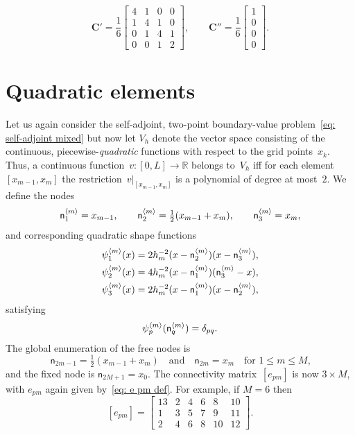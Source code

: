 \begin{example}
\[\boldsymbol{C}'=\frac{1}{6}\begin{bmatrix}
4&1&0&0\\ 1&4&1&0\\ 0&1&4&1\\ 0&0&1&2\end{bmatrix},\qquad
\boldsymbol{C}''=\frac{1}{6}\begin{bmatrix}1\\ 0\\ 0\\ 0\end{bmatrix}.
\]





\end{example}


\section{Quadratic elements}

Let us again consider the self-adjoint, two-point boundary-value 
problem~\eqref{eq: self-adjoint mixed} but now let $V_h$ denote the vector 
space consisting of the continuous, piecewise-\emph{quadratic} functions with 
respect to the grid points~$x_k$.  Thus, a continuous 
function~$v:[0,L]\to\mathbb{R}$ belongs to~$V_h$ iff for each 
element~$[x_{m-1},x_m]$ the restriction~$v|_{[x_{m-1},x_m]}$ is a polynomial of 
degree at most~$2$.  We define the nodes
\[
\mathsf{n}^{\langle m\rangle}_1=x_{m-1},\qquad
\mathsf{n}^{\langle m\rangle}_2=\tfrac12(x_{m-1}+x_m),\qquad
\mathsf{n}^{\langle m\rangle}_3=x_m,
\]
and corresponding quadratic shape functions
\begin{align*}
\psi^{\langle m\rangle}_1(x)
	&=2h_m^{-2}(x-\mathsf{n}^{\langle m\rangle}_2)(x-\mathsf{n}^{\langle m\rangle}_3),\\
\psi^{\langle m\rangle}_2(x)
	&=4h_m^{-2}(x-\mathsf{n}^{\langle m\rangle}_1)(\mathsf{n}^{\langle m\rangle}_3-x),\\
\psi^{\langle m\rangle}_3(x)
	&=2h_m^{-2}(x-\mathsf{n}^{\langle m\rangle}_1)(x-\mathsf{n}^{\langle m\rangle}_2),
\end{align*}
satisfying
\[
\psi^{\langle m\rangle}_p(\mathsf{n}^{\langle m\rangle}_q)=\delta_{pq}.
\]
The global enumeration of the free nodes is
\[
\mathsf{n}_{2m-1}=\tfrac12(x_{m-1}+x_m)
\quad\text{and}\quad
\mathsf{n}_{2m}=x_m\quad\text{for $1\le m\le M$,}
\]
and the fixed node is $\mathsf{n}_{2M+1}=x_0$.  The connectivity 
matrix~$[e_{pm}]$ is now $3\times M$, with $e_{pm}$ again given 
by~\eqref{eq: e pm def}.  For example, if $M=6$ then 
\[
[e_{pm}]=\begin{bmatrix}
13&2&4&6&8&10\\
 1&3&5&7&9&11\\
 2&4&6&8&10&12          
\end{bmatrix}.
\]

